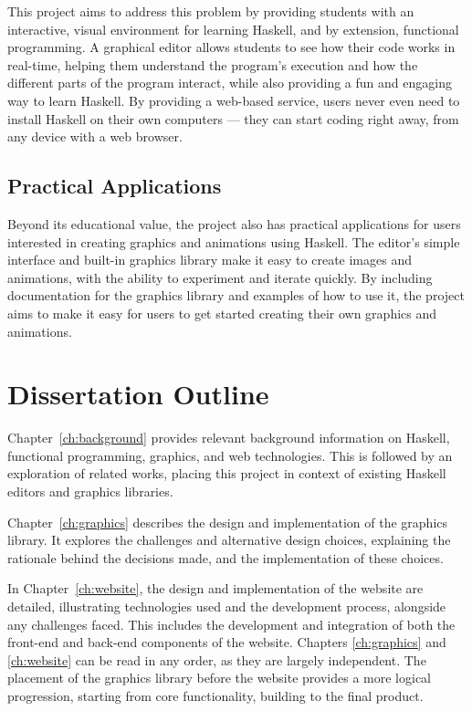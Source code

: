 \documentclass[../main.tex]{subfiles}
\begin{document}
        This project aims to address this problem by providing students with an
            interactive, visual environment for learning Haskell, and by extension,
            functional programming.
        A graphical editor allows students to see how their code works in real-time,
            helping them understand the program's execution and how the different parts of
            the program interact, while also providing a fun and engaging way to learn
            Haskell.
        By providing a web-based service, users never even need to install Haskell on
            their own computers — they can start coding right away, from any device with a
            web browser.

    \subsection{Practical Applications}
        Beyond its educational value, the project also has practical applications for
            users interested in creating graphics and animations using Haskell.
        The editor's simple interface and built-in graphics library make it easy to
            create images and animations, with the ability to experiment and iterate
            quickly.
        By including documentation for the graphics library and examples of how to use
            it, the project aims to make it easy for users to get started creating their
            own graphics and animations.

    \section{Dissertation Outline}
        Chapter~\ref{ch:background} provides relevant background information on
            Haskell, functional programming, graphics, and web technologies.
        This is followed by an exploration of related works, placing this project in
            context of existing Haskell editors and graphics libraries.

        Chapter~\ref{ch:graphics} describes the design and implementation of the
            graphics library.
        It explores the challenges and alternative design choices, explaining the
            rationale behind the decisions made, and the implementation of these choices.

        In Chapter~\ref{ch:website}, the design and implementation of the website are
            detailed, illustrating technologies used and the development process, alongside
            any challenges faced.
        This includes the development and integration of both the front-end and
            back-end components of the website.
        Chapters \ref{ch:graphics} and \ref{ch:website} can be read in any order, as
            they are largely independent.
        The placement of the graphics library before the website provides a more
            logical progression, starting from core functionality, building to the final
            product.
\end{document}
